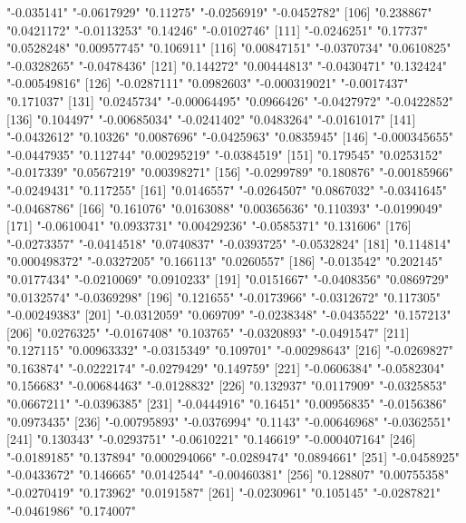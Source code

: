 \begin{Schunk}
\begin{Soutput}
[101] "-0.035141"    "-0.0617929"   "0.11275"      "-0.0256919"   "-0.0452782"  
[106] "0.238867"     "0.0421172"    "-0.0113253"   "0.14246"      "-0.0102746"  
[111] "-0.0246251"   "0.17737"      "0.0528248"    "0.00957745"   "0.106911"    
[116] "0.00847151"   "-0.0370734"   "0.0610825"    "-0.0328265"   "-0.0478436"  
[121] "0.144272"     "0.00444813"   "-0.0430471"   "0.132424"     "-0.00549816" 
[126] "-0.0287111"   "0.0982603"    "-0.000319021" "-0.0017437"   "0.171037"    
[131] "0.0245734"    "-0.00064495"  "0.0966426"    "-0.0427972"   "-0.0422852"  
[136] "0.104497"     "-0.00685034"  "-0.0241402"   "0.0483264"    "-0.0161017"  
[141] "-0.0432612"   "0.10326"      "0.0087696"    "-0.0425963"   "0.0835945"   
[146] "-0.000345655" "-0.0447935"   "0.112744"     "0.00295219"   "-0.0384519"  
[151] "0.179545"     "0.0253152"    "-0.017339"    "0.0567219"    "0.00398271"  
[156] "-0.0299789"   "0.180876"     "-0.00185966"  "-0.0249431"   "0.117255"    
[161] "0.0146557"    "-0.0264507"   "0.0867032"    "-0.0341645"   "-0.0468786"  
[166] "0.161076"     "0.0163088"    "0.00365636"   "0.110393"     "-0.0199049"  
[171] "-0.0610041"   "0.0933731"    "0.00429236"   "-0.0585371"   "0.131606"    
[176] "-0.0273357"   "-0.0414518"   "0.0740837"    "-0.0393725"   "-0.0532824"  
[181] "0.114814"     "0.000498372"  "-0.0327205"   "0.166113"     "0.0260557"   
[186] "-0.013542"    "0.202145"     "0.0177434"    "-0.0210069"   "0.0910233"   
[191] "0.0151667"    "-0.0408356"   "0.0869729"    "0.0132574"    "-0.0369298"  
[196] "0.121655"     "-0.0173966"   "-0.0312672"   "0.117305"     "-0.00249383" 
[201] "-0.0312059"   "0.069709"     "-0.0238348"   "-0.0435522"   "0.157213"    
[206] "0.0276325"    "-0.0167408"   "0.103765"     "-0.0320893"   "-0.0491547"  
[211] "0.127115"     "0.00963332"   "-0.0315349"   "0.109701"     "-0.00298643" 
[216] "-0.0269827"   "0.163874"     "-0.0222174"   "-0.0279429"   "0.149759"    
[221] "-0.0606384"   "-0.0582304"   "0.156683"     "-0.00684463"  "-0.0128832"  
[226] "0.132937"     "0.0117909"    "-0.0325853"   "0.0667211"    "-0.0396385"  
[231] "-0.0444916"   "0.16451"      "0.00956835"   "-0.0156386"   "0.0973435"   
[236] "-0.00795893"  "-0.0376994"   "0.1143"       "-0.00646968"  "-0.0362551"  
[241] "0.130343"     "-0.0293751"   "-0.0610221"   "0.146619"     "-0.000407164"
[246] "-0.0189185"   "0.137894"     "0.000294066"  "-0.0289474"   "0.0894661"   
[251] "-0.0458925"   "-0.0433672"   "0.146665"     "0.0142544"    "-0.00460381" 
[256] "0.128807"     "0.00755358"   "-0.0270419"   "0.173962"     "0.0191587"   
[261] "-0.0230961"   "0.105145"     "-0.0287821"   "-0.0461986"   "0.174007"    

\end{Soutput}
\end{Schunk}
